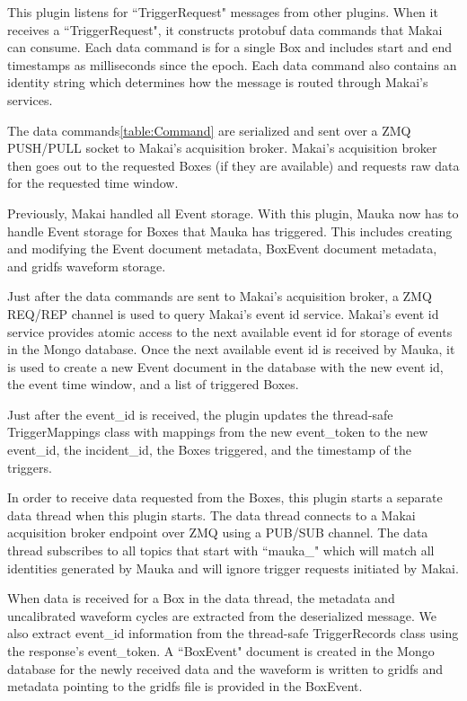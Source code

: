 This plugin listens for ``TriggerRequest" messages from other plugins. When it receives a ``TriggerRequest", it constructs protobuf data commands that Makai can consume. Each data command is for a single Box and includes start and end timestamps as milliseconds since the epoch. Each data command also contains an identity string which determines how the message is routed through Makai's services.

The data commands\ref{table:Command} are serialized and sent over a ZMQ PUSH/PULL socket to Makai's acquisition broker. Makai's acquisition broker then goes out to the requested Boxes (if they are available) and requests raw data for the requested time window.

Previously, Makai handled all Event storage. With this plugin, Mauka now has to handle Event storage for Boxes that Mauka has triggered. This includes creating and modifying the Event document metadata, BoxEvent document metadata, and gridfs waveform storage.

Just after the data commands are sent to Makai's acquisition broker, a ZMQ REQ/REP channel is used to query Makai's event id service. Makai's event id service provides atomic access to the next available event id for storage of events in the Mongo database. Once the next available event id is received by Mauka, it is used to create a new Event document in the database with the new event id, the event time window, and a list of triggered Boxes.

Just after the event\_id is received, the plugin updates the thread-safe TriggerMappings class with mappings from the new event\_token to the new event\_id, the incident\_id, the Boxes triggered, and the timestamp of the triggers.

In order to receive data requested from the Boxes, this plugin starts a separate data thread when this plugin starts. The data thread connects to a Makai acquisition broker endpoint over ZMQ using a PUB/SUB channel. The data thread subscribes to all topics that start with ``mauka\_" which will match all identities generated by Mauka and will ignore trigger requests initiated by Makai.

When data is received for a Box in the data thread, the metadata and uncalibrated waveform cycles are extracted from the deserialized message. We also extract event\_id information from the thread-safe TriggerRecords class using the response's event\_token. A ``BoxEvent" document is created in the Mongo database for the newly received data and the waveform is written to gridfs and metadata pointing to the gridfs file is provided in the BoxEvent.


